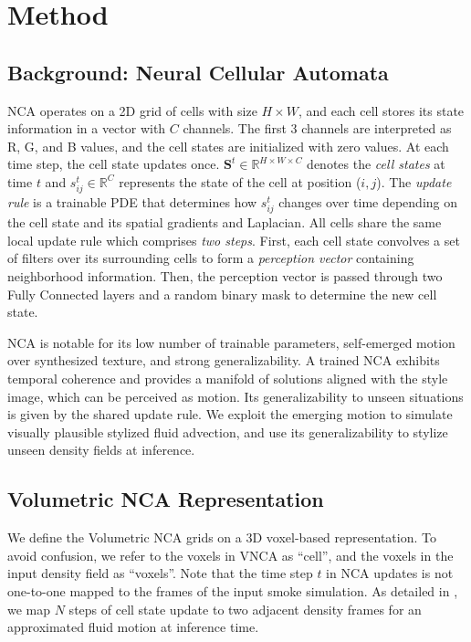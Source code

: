 \section{Method}
\subsection{Background: Neural Cellular Automata}
NCA operates on a 2D grid of cells with size $H\times W$, and each cell stores its state information in a vector with $C$ channels. 
The first 3 channels are interpreted as R, G, and B values, and the cell states are initialized with zero values. 
At each time step, the cell state updates once. 
$\mathbf{S}^t \in \mathbb{R}^{H\times W\times C}$ denotes the \textit{cell states} at time $t$ and $s^t_{ij} \in \mathbb{R}^C$ represents the state of the cell at position ($i, j$).  
The \textit{update rule} is a trainable PDE that determines how $s^t_{ij}$ changes over time depending on the cell state and its spatial gradients and Laplacian. 
All cells share the same local update rule which comprises \textit{two steps}. 
First, each cell state convolves a set of filters over its surrounding cells to form a \textit{perception vector} containing neighborhood information. 
Then, the perception vector is passed through two Fully Connected layers and a random binary mask to determine the new cell state.

NCA is notable for its low number of trainable parameters, self-emerged motion over synthesized texture, and strong generalizability.  
A trained NCA exhibits temporal coherence and provides a manifold of solutions aligned with the style image, which can be perceived as motion. 
Its generalizability to unseen situations is given by the shared update rule. 
We exploit the emerging motion to simulate visually plausible stylized fluid advection, and use its generalizability to stylize unseen density fields at inference. 


\subsection{Volumetric NCA Representation} 
\label{sec:vnca}
We define the Volumetric NCA grids on a 3D voxel-based representation. 
To avoid confusion, we refer to the voxels in VNCA as ``cell'', and the voxels in the input density field as ``voxels''. 
Note that the time step $t$ in NCA updates is not one-to-one mapped to the frames of the input smoke simulation. 
As detailed in , we map $N$ steps of cell state update to two adjacent density frames for an approximated fluid motion at inference time.  

